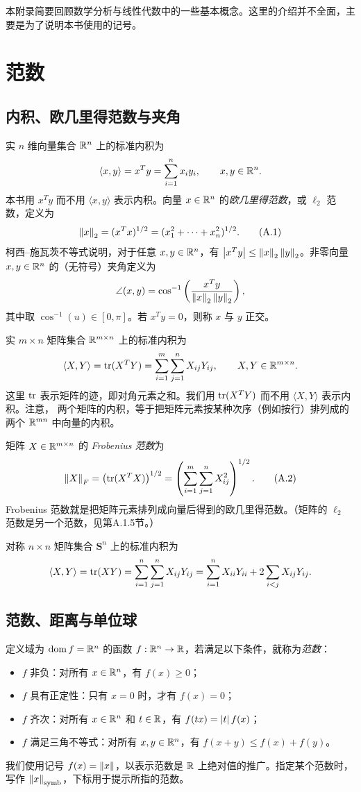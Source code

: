 本附录简要回顾数学分析与线性代数中的一些基本概念。这里的介绍并不全面，主要是为了说明本书使用的记号。

\section{范数}
\subsection{内积、欧几里得范数与夹角}
实 $n$ 维向量集合 $\mathbb R^n$ 上的标准内积为
\[
 \langle x,y\rangle=x^Ty=\sum_{i=1}^n x_iy_i,\qquad x,y\in\mathbb R^n.
\]
本书用 $x^Ty$ 而不用 $\langle x,y\rangle$ 表示内积。向量 $x\in\mathbb R^n$ 的\emph{欧几里得范数}，或 $\ell_2$ 范数，定义为
\begin{equation}
 \left\lVert x\right\rVert_2=(x^Tx)^{1/2}=(x_1^2+\cdots+x_n^2)^{1/2}.\tag{A.1}
\end{equation}
柯西--施瓦茨不等式说明，对于任意 $x,y\in\mathbb R^n$，有 $\left\lvert x^Ty\right\rvert\leq\left\lVert x\right\rVert_2\left\lVert y\right\rVert_2$。非零向量 $x,y\in\mathbb R^n$ 的（无符号）夹角定义为
\[
 \angle(x,y)=\cos^{-1}\left(\frac{x^Ty}{\left\lVert x\right\rVert_2\left\lVert y\right\rVert_2}\right),
\]
其中取 $\cos^{-1}(u)\in[0,\pi]$。若 $x^Ty=0$，则称 $x$ 与 $y$ 正交。

实 $m\times n$ 矩阵集合 $\mathbb R^{m\times n}$ 上的标准内积为
\[
 \langle X,Y\rangle=\operatorname{tr}(X^TY)=\sum_{i=1}^m\sum_{j=1}^n X_{ij}Y_{ij},\qquad X,Y\in\mathbb R^{m\times n}.
\]
这里 $\operatorname{tr}$ 表示矩阵的迹，即对角元素之和。我们用 $\operatorname{tr}(X^TY)$ 而不用 $\langle X,Y\rangle$ 表示内积。注意，
两个矩阵的内积，等于把矩阵元素按某种次序（例如按行）排列成的两个 $\mathbb R^{mn}$ 中向量的内积。

矩阵 $X\in\mathbb R^{m\times n}$ 的 \emph{Frobenius 范数}为
\begin{equation}
 \left\lVert X\right\rVert_F=\bigl(\operatorname{tr}(X^TX)\bigr)^{1/2}
 =\left(\sum_{i=1}^m\sum_{j=1}^n X_{ij}^2\right)^{1/2}.\tag{A.2}
\end{equation}
Frobenius 范数就是把矩阵元素排列成向量后得到的欧几里得范数。（矩阵的 $\ell_2$ 范数是另一个范数，见第A.1.5节。）

对称 $n\times n$ 矩阵集合 $\mathbf S^n$ 上的标准内积为
\[
 \langle X,Y\rangle=\operatorname{tr}(XY)=\sum_{i=1}^n\sum_{j=1}^n X_{ij}Y_{ij}
 =\sum_{i=1}^n X_{ii}Y_{ii}+2\sum_{i<j}X_{ij}Y_{ij}.
\]

\subsection{范数、距离与单位球}
定义域为 $\operatorname{dom} f=\mathbb R^n$ 的函数 $f:\mathbb R^n\to\mathbb R$，若满足以下条件，就称为\emph{范数}：
\begin{itemize}
\item $f$ 非负：对所有 $x\in\mathbb R^n$，有 $f(x)\geq0$；
\item $f$ 具有正定性：只有 $x=0$ 时，才有 $f(x)=0$；
\item $f$ 齐次：对所有 $x\in\mathbb R^n$ 和 $t\in\mathbb R$，有 $f(tx)=\left\lvert t\right\rvert f(x)$；
\item $f$ 满足三角不等式：对所有 $x,y\in\mathbb R^n$，有 $f(x+y)\leq f(x)+f(y)$。
\end{itemize}
我们使用记号 $f(x)=\left\lVert x\right\rVert$，以表示范数是 $\mathbb R$ 上绝对值的推广。指定某个范数时，写作 $\left\lVert x\right\rVert_{\mathrm{symb}}$，下标用于提示所指的范数。


